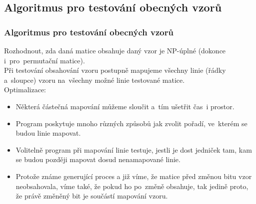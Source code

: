 \documentclass{beamer}
\begin{document}
\subsection{Algoritmus pro testování obecných vzorů}
\begin{frame}
\frametitle{Algoritmus pro testování obecných vzorů}
Rozhodnout, zda daná matice obsahuje daný vzor je NP-úplné (dokonce
i~pro~permutační matice).\\
\pause
\vspace{1em}
Při testování obsahování vzoru postupně mapujeme všechny linie (řádky a~sloupce) vzoru na~všechny možné linie testované matice.\\
\pause
\vspace{1em}
Optimalizace:
\begin{itemize}
\item Některá částečná mapování můžeme sloučit a~tím ušetřit čas~i prostor.
\pause
\item Program poskytuje mnoho různých způsobů jak zvolit pořadí, ve~kterém se budou linie mapovat.
\pause
\item Volitelně program při mapování linie testuje, jestli je dost jedniček tam, kam se budou později mapovat dosud nenamapované linie.
\pause
\item Protože známe generující proces a již víme, že matice před změnou bitu vzor neobsahovala, víme také, že pokud ho po~změně obsahuje, tak jedině proto, že právě změněný bit je součástí mapování vzoru.
\end{itemize}
\end{frame}
\end{document}
